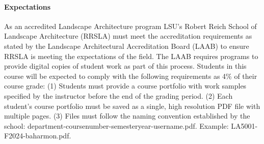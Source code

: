 \documentclass[11pt,article,oneside]{memoir}
\begin{document}
\paragraph{Expectations}
As an accredited Landscape Architecture program
LSU's Robert Reich School of Landscape Architecture (RRSLA) 
must meet the accreditation requirements 
as stated by the Landscape Architectural Accreditation
Board (LAAB) to ensure RRSLA
 is meeting the expectations of the field. 
The LAAB requires programs to provide digital copies 
of student work as part of this process.
Students in this course will be expected 
to comply with the following requirements
as 4\% of their course grade: 
(1) Students must provide a course portfolio
with work samples specified by the instructor 
before the end of the grading period. 
(2) Each student's course portfolio must be saved as 
a single, high resolution PDF file with multiple pages. 
(3) Files must follow the naming convention
established by the school: 
department-coursenumber-semesteryear-username.pdf.
Example: LA5001-F2024-baharmon.pdf.
\end{document}
